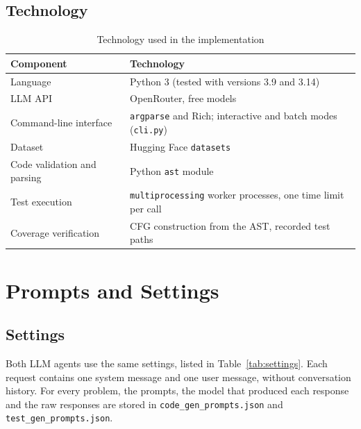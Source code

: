 \documentclass[11pt, a4paper]{article}
\begin{document}
\subsection{Technology}

\begin{table}[H]
    \centering
    \small
    \begin{tabular}{ll}
        \toprule
        \textbf{Component} & \textbf{Technology} \\
        \midrule
        Language & Python 3 (tested with versions 3.9 and 3.14) \\
        LLM API & OpenRouter, free models \\
        Command-line interface & \texttt{argparse} and Rich; interactive and batch modes (\texttt{cli.py}) \\
        Dataset & Hugging Face \texttt{datasets} \\
        Code validation and parsing & Python \texttt{ast} module \\
        Test execution & \texttt{multiprocessing} worker processes, one time limit per call \\
        Coverage verification & CFG construction from the AST, recorded test paths \\
        \bottomrule
    \end{tabular}
    \caption{Technology used in the implementation}
\end{table}

\section{Prompts and Settings}
\label{sec:prompts}

\subsection{Settings}

Both LLM agents use the same settings, listed in Table~\ref{tab:settings}. Each request contains one system message and one user message, without conversation history. For every problem, the prompts, the model that produced each response and the raw responses are stored in \texttt{code\_gen\_prompts.json} and \texttt{test\_gen\_prompts.json}.
\end{document}

